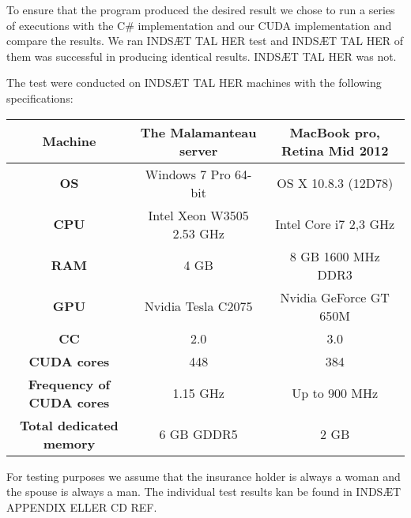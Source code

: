 To ensure that the program produced the desired result we chose to run a series of executions with the C\# implementation and our CUDA implementation and compare the results. We ran INDSÆT TAL HER test and INDSÆT TAL HER of them was successful in producing identical results. INDSÆT TAL HER was not. 

The test were conducted on INDSÆT TAL HER machines with the following specifications:

\begin{center}
\begin{tabular}{|c|c|c|} 
	\hline
	\multicolumn{1}{|m{2.8cm}|}{\centering \textbf{Machine}} & The Malamanteau server & MacBook pro, Retina Mid 2012 \\ \hline
	\multicolumn{1}{|m{2.8cm}|}{\centering \textbf{OS}} & Windows 7 Pro 64-bit & OS X 10.8.3 (12D78)\\ \hline
	\multicolumn{1}{|m{2.8cm}|}{\centering \textbf{CPU}} & Intel Xeon W3505 2.53 GHz & Intel Core i7 2,3 GHz \\ \hline
	\multicolumn{1}{|m{2.8cm}|}{\centering \textbf{RAM}} & 4 GB & 8 GB 1600 MHz DDR3\\ \hline
	\multicolumn{1}{|m{2.8cm}|}{\centering \textbf{GPU}} & Nvidia Tesla C2075\cite{tesl} & Nvidia GeForce GT 650M \cite{kepl}\\ \hline
	\multicolumn{1}{|m{2.8cm}|}{\centering \textbf{CC}} & 2.0 & 3.0\\ \hline
	\multicolumn{1}{|m{2.8cm}|}{\centering \textbf{CUDA cores}} & 448 & 384\\ \hline
	\multicolumn{1}{|m{2.8cm}|}{\centering \textbf{Frequency of CUDA cores}} & 1.15 GHz & Up to 900 MHz\\ \hline
	\multicolumn{1}{|m{2.8cm}|}{\centering \textbf{Total dedicated memory}} & 6 GB GDDR5 & 2 GB\\ \hline
\end{tabular}
\end{center}

For testing purposes we assume that the insurance holder is always a woman and the spouse is always a man. The individual test results kan be found in INDSÆT APPENDIX ELLER CD REF.

